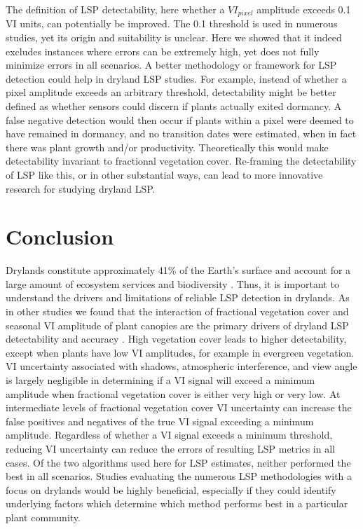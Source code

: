 \documentclass{article}
\begin{document}
The definition of LSP detectability, here whether a $VI_{pixel}$ amplitude exceeds 0.1 VI units, can potentially be improved. The 0.1 threshold is used in numerous studies, yet its origin and suitability is unclear. Here we showed that it indeed excludes instances where errors can be extremely high, yet does not fully minimize errors in all scenarios. A better methodology or framework for LSP detection could help in dryland LSP studies. For example, instead of whether a pixel amplitude exceeds an arbitrary threshold, detectability might be better defined as whether sensors could discern if plants actually exited dormancy. A false negative detection would then occur if plants within a pixel were deemed to have remained in dormancy, and no transition dates were estimated, when in fact there was plant growth and/or productivity. Theoretically this would make detectability invariant to fractional vegetation cover. Re-framing the detectability of LSP like this, or in other substantial ways, can lead to more innovative research for studying dryland LSP.


\section{Conclusion}

Drylands constitute approximately 41\% of the Earth’s surface and account for a large amount of ecosystem services and biodiversity \cite{safriel2005, chapin1996}. Thus, it is important to understand the drivers and limitations of reliable LSP detection in drylands. As in other studies we found that the interaction of fractional vegetation cover and seasonal VI amplitude of plant canopies are the primary drivers of dryland LSP detectability and accuracy \cite{smith2019, peng2021}. High vegetation cover leads to higher detectability, except when plants have low VI amplitudes, for example in evergreen vegetation. VI uncertainty associated with shadows, atmospheric interference, and view angle is largely negligible in determining if a VI signal will exceed a minimum amplitude when fractional vegetation cover is either very high or very low. At intermediate levels of fractional vegetation cover VI uncertainty can increase the false positives and negatives of the true VI signal exceeding a minimum amplitude. Regardless of whether a VI signal exceeds a minimum threshold, reducing VI uncertainty can reduce the errors of resulting LSP metrics in all cases. Of the two algorithms used here for LSP estimates, neither performed the best in all scenarios. Studies evaluating the numerous LSP methodologies with a focus on drylands would be highly beneficial, especially if they could identify underlying factors which determine which method performs best in a particular plant community.  
\end{document}
